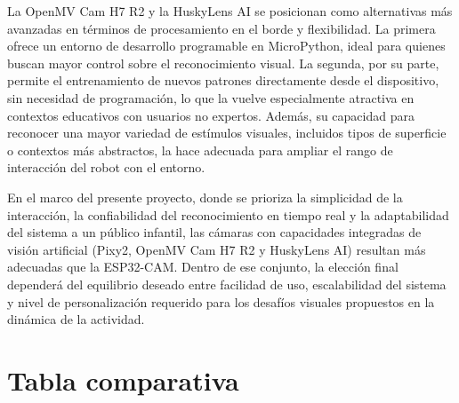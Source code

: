 \documentclass{prgrado}
\begin{document}
La OpenMV Cam H7 R2 y la HuskyLens AI se posicionan como alternativas más avanzadas en términos de procesamiento en el borde y flexibilidad. La primera ofrece un entorno de desarrollo programable en MicroPython, ideal para quienes buscan mayor control sobre el reconocimiento visual. La segunda, por su parte, permite el entrenamiento de nuevos patrones directamente desde el dispositivo, sin necesidad de programación, lo que la vuelve especialmente atractiva en contextos educativos con usuarios no expertos. Además, su capacidad para reconocer una mayor variedad de estímulos visuales, incluidos tipos de superficie o contextos más abstractos, la hace adecuada para ampliar el rango de interacción del robot con el entorno.

En el marco del presente proyecto, donde se prioriza la simplicidad de la interacción, la confiabilidad del reconocimiento en tiempo real y la adaptabilidad del sistema a un público infantil, las cámaras con capacidades integradas de visión artificial (Pixy2, OpenMV Cam H7 R2 y HuskyLens AI) resultan más adecuadas que la ESP32-CAM. Dentro de ese conjunto, la elección final dependerá del equilibrio deseado entre facilidad de uso, escalabilidad del sistema y nivel de personalización requerido para los desafíos visuales propuestos en la dinámica de la actividad.

\section{Tabla comparativa}
\end{document}

